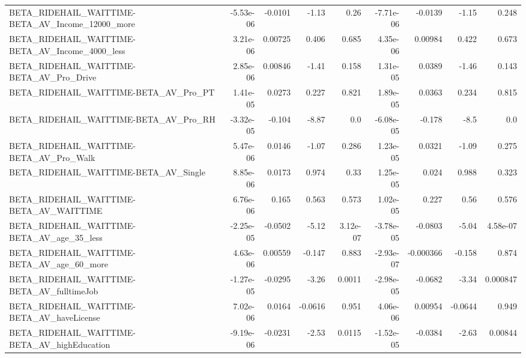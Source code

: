 \begin{tabular}{lrrrrrrrr}
BETA\_RIDEHAIL\_WAITTIME-BETA\_AV\_Income\_12000\_more   &   -5.53e-06 &      -0.0101 &     -1.13 &     0.26 &  -7.71e-06 &     -0.0139 &        -1.15 &         0.248 \\
BETA\_RIDEHAIL\_WAITTIME-BETA\_AV\_Income\_4000\_less    &    3.21e-06 &      0.00725 &     0.406 &    0.685 &   4.35e-06 &     0.00984 &        0.422 &         0.673 \\
BETA\_RIDEHAIL\_WAITTIME-BETA\_AV\_Pro\_Drive           &    2.85e-06 &      0.00846 &     -1.41 &    0.158 &   1.31e-05 &      0.0389 &        -1.46 &         0.143 \\
BETA\_RIDEHAIL\_WAITTIME-BETA\_AV\_Pro\_PT              &    1.41e-05 &       0.0273 &     0.227 &    0.821 &   1.89e-05 &      0.0363 &        0.234 &         0.815 \\
BETA\_RIDEHAIL\_WAITTIME-BETA\_AV\_Pro\_RH              &   -3.32e-05 &       -0.104 &     -8.87 &      0.0 &  -6.08e-05 &      -0.178 &         -8.5 &           0.0 \\
BETA\_RIDEHAIL\_WAITTIME-BETA\_AV\_Pro\_Walk            &    5.47e-06 &       0.0146 &     -1.07 &    0.286 &   1.23e-05 &      0.0321 &        -1.09 &         0.275 \\
BETA\_RIDEHAIL\_WAITTIME-BETA\_AV\_Single              &    8.85e-06 &       0.0173 &     0.974 &     0.33 &   1.25e-05 &       0.024 &        0.988 &         0.323 \\
BETA\_RIDEHAIL\_WAITTIME-BETA\_AV\_WAITTIME            &    6.76e-06 &        0.165 &     0.563 &    0.573 &   1.02e-05 &       0.227 &         0.56 &         0.576 \\
BETA\_RIDEHAIL\_WAITTIME-BETA\_AV\_age\_35\_less         &   -2.25e-05 &      -0.0502 &     -5.12 & 3.12e-07 &  -3.78e-05 &     -0.0803 &        -5.04 &      4.58e-07 \\
BETA\_RIDEHAIL\_WAITTIME-BETA\_AV\_age\_60\_more         &    4.63e-06 &      0.00559 &    -0.147 &    0.883 &  -2.93e-07 &   -0.000366 &       -0.158 &         0.874 \\
BETA\_RIDEHAIL\_WAITTIME-BETA\_AV\_fulltimeJob         &   -1.27e-05 &      -0.0295 &     -3.26 &   0.0011 &  -2.98e-05 &     -0.0682 &        -3.34 &      0.000847 \\
BETA\_RIDEHAIL\_WAITTIME-BETA\_AV\_haveLicense         &    7.02e-06 &       0.0164 &   -0.0616 &    0.951 &   4.06e-06 &     0.00954 &      -0.0644 &         0.949 \\
BETA\_RIDEHAIL\_WAITTIME-BETA\_AV\_highEducation       &   -9.19e-06 &      -0.0231 &     -2.53 &   0.0115 &  -1.52e-05 &     -0.0384 &        -2.63 &       0.00844 \\

\end{tabular}
